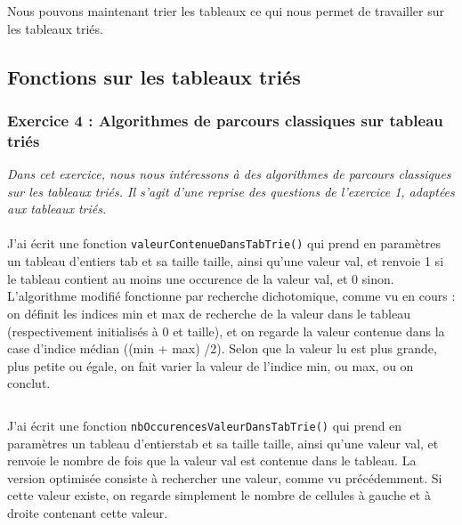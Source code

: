 Nous pouvons maintenant trier les tableaux ce qui nous permet de travailler sur les tableaux triés.

\subsection{Fonctions sur les tableaux triés}

\subsubsection{Exercice 4 : Algorithmes de parcours classiques sur tableau triés}
\textit{Dans cet exercice, nous nous intéressons à des algorithmes de parcours classiques sur les tableaux triés. Il s’agit d’une reprise des questions de l’exercice 1, adaptées aux tableaux triés.}
\\\\
J'ai écrit une fonction \texttt{valeurContenueDansTabTrie()} qui prend en paramètres un tableau d’entiers tab et sa taille taille, ainsi qu’une valeur val, et renvoie 1 si le tableau contient au moins une occurence de la valeur val, et 0 sinon. L’algorithme modifié fonctionne par recherche dichotomique, comme vu en cours : on définit les indices min et max de recherche de la valeur dans le tableau (respectivement initialisés à 0 et taille), et on regarde la valeur contenue dans la case d’indice médian ((min + max) /2). Selon que la valeur lu est plus grande, plus petite ou égale, on fait varier la valeur de l’indice min, ou max, ou on conclut.
\inputminted[linenos,firstline=7,lastline=22]{cpp}{../sources/cpp/TP1-2/manipTableauxTries.c}

J'ai écrit une fonction \texttt{nbOccurencesValeurDansTabTrie()} qui prend en paramètres un tableau d’entierstab et sa taille taille, ainsi qu’une valeur val, et renvoie le nombre de fois que la valeur val est contenue dans le tableau. La version optimisée consiste à rechercher une valeur, comme vu précédemment. Si cette valeur existe, on regarde simplement le nombre de cellules à gauche et à droite contenant cette valeur.
\inputminted[linenos,firstline=24,lastline=48]{cpp}{../sources/cpp/TP1-2/manipTableauxTries.c}

